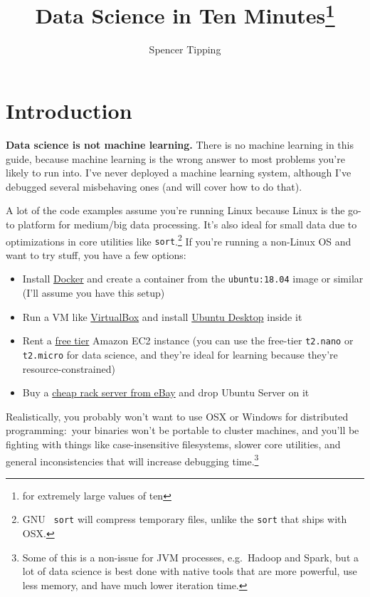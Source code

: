 \documentclass{article}
\title{Data Science in Ten Minutes\footnote{for extremely large values of ten}}
\author{Spencer Tipping}
\newcommand{\lnk}[2]{\href{#1}{\textcolor[rgb]{1.0,0.0,0.0}{#2}}}
\begin{document}
  \maketitle
  \tableofcontents

  \section*{Introduction}
  {\bf Data science is not machine learning.} There is no machine learning in
  this guide, because machine learning is the wrong answer to most problems
  you're likely to run into. I've never deployed a machine learning system,
  although I've debugged several misbehaving ones (and will cover how to do
  that).

  A lot of the code examples assume you're running Linux because Linux is the
  go-to platform for medium/big data processing. It's also ideal for small data
  due to optimizations in core utilities like {\tt sort}.\footnote{GNU {\tt
  sort} will compress temporary files, unlike the {\tt sort} that ships with
  OSX.} If you're running a non-Linux OS and want to try stuff, you have a few
  options:

  \begin{itemize}
    \item Install \lnk{https://docker.com}{Docker} and create a container from
          the {\tt ubuntu:18.04} image or similar (I'll assume you have this
          setup)
    \item Run a VM like \lnk{https://www.virtualbox.org/}{VirtualBox} and
          install \lnk{https://www.ubuntu.com/desktop}{Ubuntu Desktop} inside it
    \item Rent a \lnk{https://aws.amazon.com/free/}{free tier} Amazon EC2
          instance (you can use the free-tier {\tt t2.nano} or {\tt t2.micro}
          for data science, and they're ideal for learning because they're
          resource-constrained)
    \item Buy a
          \lnk{https://github.com/spencertipping/www/blob/master/datacenter.md}{cheap
          rack server from eBay} and drop Ubuntu Server on it
  \end{itemize}

  Realistically, you probably won't want to use OSX or Windows for distributed
  programming:~your binaries won't be portable to cluster machines, and you'll
  be fighting with things like case-insensitive filesystems, slower core
  utilities, and general inconsistencies that will increase debugging
  time.\footnote{Some of this is a non-issue for JVM processes, e.g.~Hadoop and
  Spark, but a lot of data science is best done with native tools that are more
  powerful, use less memory, and have much lower iteration time.}
\end{document}
